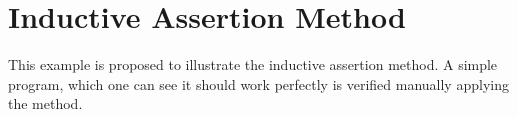 
%

\chapter{Inductive Assertion Method}

This example is proposed to illustrate the inductive assertion method. 
%
A simple program, which one can see it should work perfectly is verified manually applying the method.
\label{app:exampleFactorial}
\begin{example}

\end{example}



